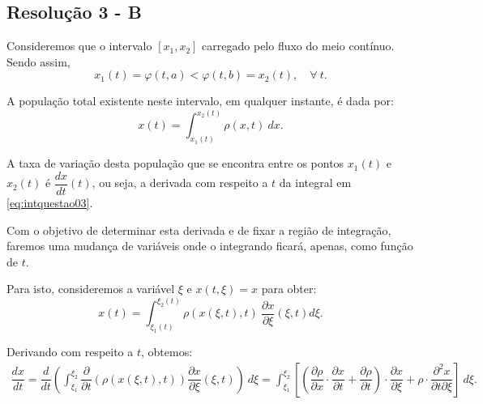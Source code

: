 \subsection*{\blue Resolução 3 - \textbf{B}}


Consideremos que o intervalo $[x_1, x_2]$ carregado pelo fluxo do meio contínuo. Sendo assim, 
$$
x_1(t) = \varphi(t,a) < \varphi(t,b) = x_2(t), \quad \forall\ t.
$$

A população total existente neste intervalo, em qualquer instante, é dada por:
\begin{equation}\label{eq:intquestao03}
x(t) = \displaystyle\int_{x_1(t)}^{x_2(t)} \rho(x,t)\ dx.
\end{equation}


A taxa de variação desta população que se encontra entre os pontos $x_1(t)$ e $x_2(t)$ é $\dfrac{dx}{dt}(t)$, ou seja, a derivada com respeito a $t$ da integral em \eqref{eq:intquestao03}.

Com o objetivo de determinar esta derivada e de fixar a região de integração, faremos uma mudança de variáveis onde o integrando ficará, apenas, como função de $t$. 

Para isto, consideremos a variável $\xi$ e $x(t, \xi) = x$ para obter:
$$
x(t) = \displaystyle\int_{\xi_1(t)}^{\xi_2(t)} \rho(x(\xi,t),t)\ \dfrac{\partial x}{\partial \xi}(\xi, t) d\xi.
$$

Derivando com respeito a $t$, obtemos:
\begin{eqnarray*}
\dfrac{dx}{dt} 
=
\dfrac{d}{dt} \left(\displaystyle \int_{\xi_1}^{\xi_2} \dfrac{\partial}{\partial t} (\rho\left( x(\xi,t),t \right)) \dfrac{\partial x}{\partial \xi}(\xi,t) \right)\ d \xi
=
\displaystyle \int_{\xi_1}^{\xi_2} \left[ \left( \dfrac{\partial \rho}{\partial x}\cdot \dfrac{\partial x}{\partial t} + \dfrac{\partial \rho}{\partial t} \right)\cdot \dfrac{\partial x}{\partial \xi} + \rho \cdot \dfrac{\partial^2 x}{\partial t \partial \xi} \right]\ d \xi.
\end{eqnarray*}

